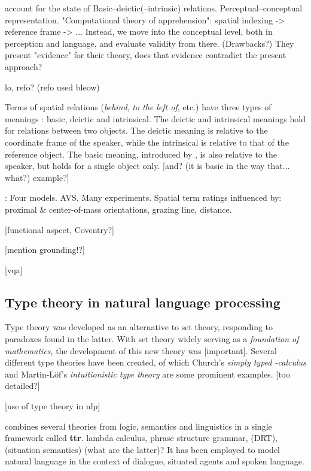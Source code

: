 \documentclass[11pt, a4paper]{article}
\begin{document}
\cite{LoganComputationalAnalysisApprehension1996} account for the state of 
Basic–deictic(–intrinsic) relations.
Perceptual–conceptual representation.
"Computational theory of apprehension": spatial indexing -> reference frame -> ... Instead, we move into the conceptual level, both in perception and language, and evaluate validity from there.
(Drawbacks?)
They present "evidence" for their theory, does that evidence contradict the present approach?

lo, refo? (refo used bleow)

Terms of spatial relations (\textit{behind}, \textit{to the left of}, etc.) have three types of meanings \citep{Garnhamunifiedtheorymeaning1989}: basic, deictic and intrinsical.
The deictic and intrinsical meanings hold for relations between two objects.
The deictic meaning is relative to the coordinate frame of the speaker, while the intrinsical is relative to that of the reference object.
The basic meaning, introduced by \cite{Garnhamunifiedtheorymeaning1989}, is also relative to the speaker, but holds for a single object only.
[and? (it is basic in the way that... what?) example?]

\cite{RegierGroundingspatiallanguage2001a}:
Four models. AVS.
Many experiments.
Spatial term ratings influenced by: proximal \& center-of-mass orientations, grazing line, distance.

[functional aspect, Coventry?]

[mention grounding!?]

[vqa]



\subsection{Type theory in natural language processing}

Type theory was developed as an alternative to set theory, responding to paradoxes found in the latter.
With set theory widely serving as a \textit{foundation of mathematics}, the development of this new theory was [important].
Several different type theories have been created, of which Church's \textit{simply typed \textlambda-calculus} \cite{church40} and Martin-Löf's \textit{intuitionistic type theory} \citep{martinlof84} are some prominent examples.
\citep{CoquandTypeTheory2015} [too detailed?]

[use of type theory in nlp]

\cite{CooperRecordsRecordTypes2005} combines several theories from logic, semantics and linguistics in a single framework called \textbf{\acrfull{ttr}}.
 lambda calculus, phrase structure grammar, (DRT), (situation semantics) (what are the latter)?
It has been employed to model natural language in the context of dialogue, situated agents and spoken language.
\end{document}
